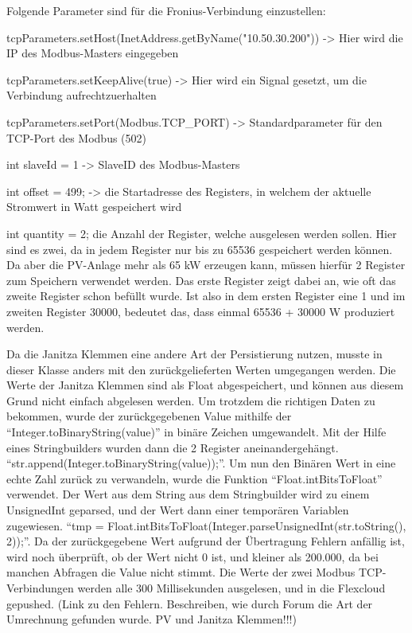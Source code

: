 Folgende Parameter sind für die Fronius-Verbindung einzustellen: 

\begin{compactitem}
  \item tcpParameters.setHost(InetAddress.getByName("10.50.30.200")) -> Hier wird die IP des Modbus-Masters eingegeben  
  \item tcpParameters.setKeepAlive(true) -> Hier wird ein Signal gesetzt, um die Verbindung aufrechtzuerhalten
  \item tcpParameters.setPort(Modbus.TCP\_PORT) -> Standardparameter für den TCP-Port des Modbus (502)  
  \item int slaveId = 1 -> SlaveID des Modbus-Masters  
  \item int offset = 499; -> die Startadresse des Registers, in welchem der aktuelle Stromwert in Watt gespeichert wird  
  \item int quantity = 2; die Anzahl der Register, welche ausgelesen werden sollen. Hier sind es zwei, da in jedem Register nur bis zu 65536 gespeichert werden können. Da aber die PV-Anlage mehr als 65 kW erzeugen kann, müssen hierfür 2 Register zum Speichern verwendet werden. Das erste Register zeigt dabei an, wie oft das zweite Register schon befüllt wurde. Ist also in dem ersten Register eine 1 und im zweiten Register 30000, bedeutet das, dass einmal 65536 + 30000 W produziert werden. 
\end{compactitem}

Da die Janitza Klemmen eine andere Art der Persistierung nutzen, musste in dieser Klasse anders mit den zurückgelieferten Werten umgegangen werden. Die Werte der Janitza Klemmen sind als Float abgespeichert, und können aus diesem Grund nicht einfach abgelesen werden. Um trotzdem die richtigen Daten zu bekommen, wurde der zurückgegebenen Value mithilfe der “Integer.toBinaryString(value)” in binäre Zeichen umgewandelt. Mit der Hilfe eines Stringbuilders wurden dann die 2 Register aneinandergehängt. “str.append(Integer.toBinaryString(value));”. Um nun den Binären Wert in eine echte Zahl zurück zu verwandeln, wurde die Funktion “Float.intBitsToFloat” verwendet. Der Wert aus dem String aus dem Stringbuilder wird zu einem UnsignedInt geparsed, und der Wert dann einer temporären Variablen zugewiesen. “tmp = Float.intBitsToFloat(Integer.parseUnsignedInt(str.toString(), 2));”. Da der zurückgegebene Wert aufgrund der Übertragung Fehlern anfällig ist, wird noch überprüft, ob der Wert nicht 0 ist, und kleiner als 200.000, da bei manchen Abfragen die Value nicht stimmt. Die Werte der zwei Modbus TCP-Verbindungen werden alle 300 Millisekunden ausgelesen, und in die Flexcloud gepushed. 
(Link zu den Fehlern. Beschreiben, wie durch Forum die Art der Umrechnung gefunden wurde. PV und Janitza Klemmen!!!) 

